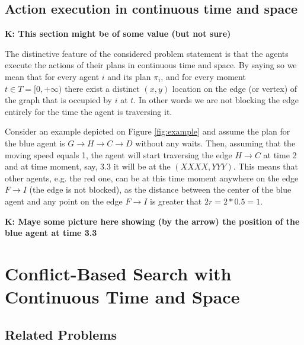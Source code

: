 






\subsection{Action execution in continuous time and space}
\textbf{K: This section might be of some value (but not sure)}

The distinctive feature of the considered problem statement is that the agents execute the actions of their plans in continuous time and space. By saying so we mean that for every agent $i$ and its plan $\pi_i$, and for every moment $t \in T=[0, +\infty)$ there exist a distinct $(x, y)$ location on the edge (or vertex) of the graph that is occupied by $i$ at $t$. In other words we are not blocking the edge entirely for the time the agent is traversing it.

Consider an example depicted on Figure \ref{fig:example} and assume the plan for the blue agent is $G \rightarrow H \rightarrow C \rightarrow D$ without any waits. Then, assuming that the moving speed equals 1, the agent will start traversing the edge $H \rightarrow C$ at time 2 and at time moment, say, $3.3$ it will be at the $(XXXX, YYY)$. This means that other agents, e.g. the red one, can be at this time moment anywhere on the edge $F \rightarrow I$ (the edge is not blocked), as the distance between the center of the blue agent and any point on the edge $F \rightarrow I$ is greater that $2r=2*0.5=1$.

\textbf{K: Maye some picture here showing (by the arrow) the position of the blue agent at time 3.3}

\section{Conflict-Based Search with Continuous Time and Space}




\subsection{Related \mapf Problems}

